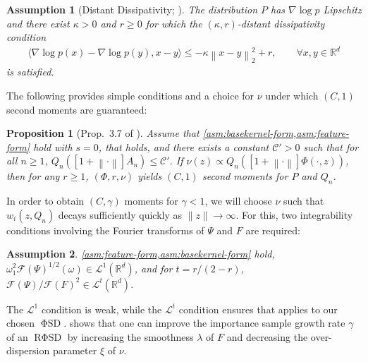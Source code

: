 \documentclass[12pt,paper=letter]{scrreprt}
\newtheorem{proposition}{Proposition}[chapter]
\def\reals{\mathbb{R}} %
\def\norm#1{\left\|{#1}\right\|} %
\newcommand{\twonorm}[1]{\norm{#1}_2} %
\newcommand{\inner}[2]{\langle{#1},{#2}\rangle} %
\newcommand{\grad}{\nabla} %
\newtheorem{assumption}{Assumption}[chapter]
\newcommand{\mcC}{\mathcal{C}}
\newcommand{\FTop}[0]{\mathscr{F}} %
\newcommand{\feat}{\Phi} %
\newcommand{\statfeat}{F}  %
\newcommand{\statkernel}{\Psi} %
\newcommand{\FSD}{\ensuremath{\operatorname{\mathrm{\Phi}SD}}\xspace}
\newcommand{\RFSD}{\ensuremath{\operatorname{R\mathrm{\Phi}SD}}\xspace}
\newcommand{\isdist}{\nu}
\begin{document}
\begin{assumption}[Distant Dissipativity; \citealp{Eberle2015,Gorham2019}] \label{ass: distant diss}
    The distribution $P$ has $\nabla \log p$ Lipschitz and there exist $\kappa > 0$ and $r \geq 0$ for which the $(\kappa,r)$-\emph{distant dissipativity} condition 
\begin{align*}
    \inner{\grad \log p(x)-\grad \log p(y)}{x-y} \leq - \kappa \twonorm{x-y}^2 + r, \qquad \forall x,y\in\reals^d
\end{align*}
is satisfied.
\end{assumption}

The following provides simple conditions and a choice for $\nu$ under which $(C,1)$ second moments are guaranteed:

\begin{proposition}[Prop.~3.7 of \citealp{huggins2018random}]  \label{prop:c-1-second-moment}
Assume that \cref{asm:basekernel-form,asm:feature-form} hold with $s=0$, that  holds, and there exists a constant $\mcC' > 0$ such that for all $n \ge 1$,
$Q_n([1 + \norm{\cdot}] A_{n}) \le \mcC'$.
If $\isdist(z) \propto Q_n([1 + \norm{\cdot}] \feat(\cdot, z))$,
then for any $r \ge 1$, $(\feat,r,\isdist)$ yields $(C,1)$ second moments for $P$ and $Q_n$. 
\end{proposition}

In order to obtain $(C,\gamma)$ moments for $\gamma < 1$, we will choose $\nu$ such that $w_i(z,Q_n)$ decays sufficiently quickly as $\|z\| \rightarrow \infty$.
For this, two integrability conditions involving the Fourier transforms of $\Psi$ and $F$ are required:

\begin{assumption} \label{asm:FT-Psi-decay-plus-Lt}
\cref{asm:feature-form,asm:basekernel-form} hold, $\omega_{1}^{2} \FTop(\statkernel)^{1/2}(\omega) \in \mathcal{L}^1(\mathbb{R}^d)$, and
for $t = r/(2 - r)$, $\FTop(\statkernel)/\FTop(\statfeat)^{2} \in \mathcal{L}^t(\mathbb{R}^d)$. 
\end{assumption}

\noindent The $\mathcal{L}^1$ condition is weak, while the $\mathcal{L}^t$ condition ensures that  applies to our chosen $\FSD$.
 shows that one can improve the importance sample growth rate $\gamma$ of an $\RFSD$ by increasing the smoothness $\lambda$ of $F$ and decreasing the over-dispersion parameter $\xi$ of $\nu$.
\end{document}
